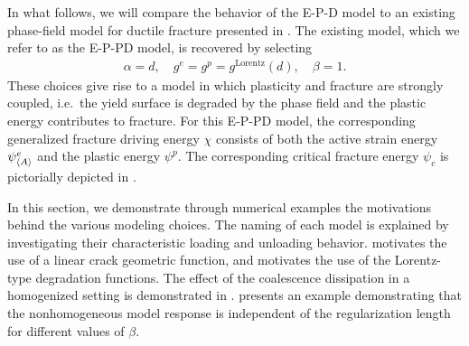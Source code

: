 In what follows, we will compare the behavior of the E-P-D model to an existing phase-field model for ductile fracture presented in \cite{brandon2020cohesive}.  The existing model,
which we refer to as the E-P-PD model,  is recovered by selecting
\begin{align*}
  \alpha = d, \quad g^e = g^p = g^\text{Lorentz}(d), \quad \beta = 1.
\end{align*}
These choices give rise to a model in which plasticity and fracture are strongly coupled, i.e.\ the yield surface is degraded by the phase field and the plastic energy contributes to fracture. For this E-P-PD model, the corresponding generalized fracture driving energy $\chi$ consists of both the active strain energy $\psi^e_{\left< A \right>}$ and the plastic energy $\psi^p$.  The corresponding critical fracture energy $\psi_c$ is pictorially depicted in .

In this section, we demonstrate through numerical examples the motivations behind the various modeling choices. The naming of each model is explained  by investigating their characteristic loading and unloading behavior.  motivates the use of a linear crack geometric function, and  motivates the use of the Lorentz-type degradation functions.
The effect of the coalescence dissipation in a homogenized setting is demonstrated in .
 presents an example demonstrating that the nonhomogeneous model response is independent of the regularization length for different values of $\beta$.

